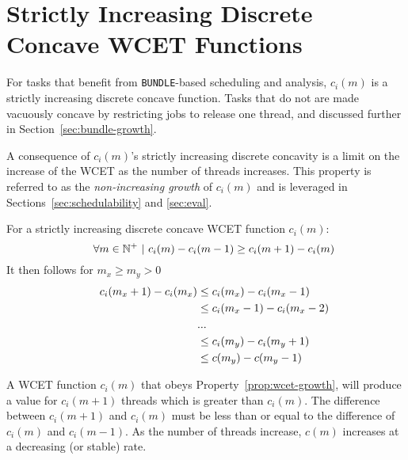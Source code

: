 \appendix

\section{Strictly Increasing Discrete Concave WCET Functions}


For tasks that benefit from \texttt{BUNDLE}-based scheduling and
analysis, ${c_i(m)}$ is a strictly increasing discrete concave
function. Tasks that do not are made vacuously concave by restricting
jobs to release one thread, and discussed further in
Section~\ref{sec:bundle-growth}. 

A consequence of ${c_i(m)}$'s strictly increasing discrete
concavity is a limit on the increase of the WCET as the number of
threads increases. This property is referred to as the
\emph{non-increasing growth} of ${c_i(m)}$ and is leveraged in
Sections~\ref{sec:schedulability} and \ref{sec:eval}.

\begin{definition}
  \label{prop:ni-growth}
  For a strictly increasing discrete
  concave WCET function ${c_i(m)}$:
  \label{prop:wcet-growth}
  \begin{equation}
    \label{eq:wcet-growth}
    \indent
    \forall m \in \mathbb{N}^+~|~c_i(m) - c_i(m - 1) \ge c_i(m + 1) - c_i(m)
  \end{equation}
  It then follows for ${m_x \ge m_y > 0}$
  \begin{align*}
    \indent
    c_i(m_x + 1) - c_i(m_x) &\le c_i(m_x) - c_i(m_x - 1) \\
    &\le c_i(m_x - 1) - c_i(m_x - 2) \\
    &... \\
    &\le c_i(m_y) - c_i(m_y + 1) \\
    &\le c(m_y) - c(m_y - 1)
  \end{align*}
\end{definition}


A WCET function ${c_i(m)}$ that obeys Property~\ref{prop:wcet-growth},
will produce a value for ${c_i(m+1)}$ threads which is greater than
${c_i(m)}$. The difference between ${c_i(m+1)}$ and ${c_i(m)}$ must be less
than or equal to the difference of ${c_i(m)}$ and ${c_i(m-1)}$. As the
number of threads increase, ${c(m)}$ increases at a decreasing (or
stable) rate. 
